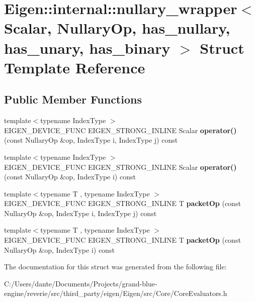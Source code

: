 \hypertarget{struct_eigen_1_1internal_1_1nullary__wrapper}{}\section{Eigen\+::internal\+::nullary\+\_\+wrapper$<$ Scalar, Nullary\+Op, has\+\_\+nullary, has\+\_\+unary, has\+\_\+binary $>$ Struct Template Reference}
\label{struct_eigen_1_1internal_1_1nullary__wrapper}
\subsection*{Public Member Functions}
\begin{DoxyCompactItemize}
\item 
\mbox{\label{struct_eigen_1_1internal_1_1nullary__wrapper_af25e8086f41c66542a620250d21ca455}} 
{\footnotesize template$<$typename Index\+Type $>$ }\\E\+I\+G\+E\+N\+\_\+\+D\+E\+V\+I\+C\+E\+\_\+\+F\+U\+NC E\+I\+G\+E\+N\+\_\+\+S\+T\+R\+O\+N\+G\+\_\+\+I\+N\+L\+I\+NE Scalar {\bfseries operator()} (const Nullary\+Op \&op, Index\+Type i, Index\+Type j) const
\item 
\mbox{\label{struct_eigen_1_1internal_1_1nullary__wrapper_afbfc90f531bf32d3da1a870cc8e65907}} 
{\footnotesize template$<$typename Index\+Type $>$ }\\E\+I\+G\+E\+N\+\_\+\+D\+E\+V\+I\+C\+E\+\_\+\+F\+U\+NC E\+I\+G\+E\+N\+\_\+\+S\+T\+R\+O\+N\+G\+\_\+\+I\+N\+L\+I\+NE Scalar {\bfseries operator()} (const Nullary\+Op \&op, Index\+Type i) const
\item 
\mbox{\label{struct_eigen_1_1internal_1_1nullary__wrapper_a7d18d3aaa762c89aa3750732914815fe}} 
{\footnotesize template$<$typename T , typename Index\+Type $>$ }\\E\+I\+G\+E\+N\+\_\+\+D\+E\+V\+I\+C\+E\+\_\+\+F\+U\+NC E\+I\+G\+E\+N\+\_\+\+S\+T\+R\+O\+N\+G\+\_\+\+I\+N\+L\+I\+NE T {\bfseries packet\+Op} (const Nullary\+Op \&op, Index\+Type i, Index\+Type j) const
\item 
\mbox{\label{struct_eigen_1_1internal_1_1nullary__wrapper_a0a79344800b51bab99b99f8eb0ee3498}} 
{\footnotesize template$<$typename T , typename Index\+Type $>$ }\\E\+I\+G\+E\+N\+\_\+\+D\+E\+V\+I\+C\+E\+\_\+\+F\+U\+NC E\+I\+G\+E\+N\+\_\+\+S\+T\+R\+O\+N\+G\+\_\+\+I\+N\+L\+I\+NE T {\bfseries packet\+Op} (const Nullary\+Op \&op, Index\+Type i) const
\end{DoxyCompactItemize}


The documentation for this struct was generated from the following file\+:\begin{DoxyCompactItemize}
\item 
C\+:/\+Users/dante/\+Documents/\+Projects/grand-\/blue-\/engine/reverie/src/third\+\_\+party/eigen/\+Eigen/src/\+Core/Core\+Evaluators.\+h\end{DoxyCompactItemize}
